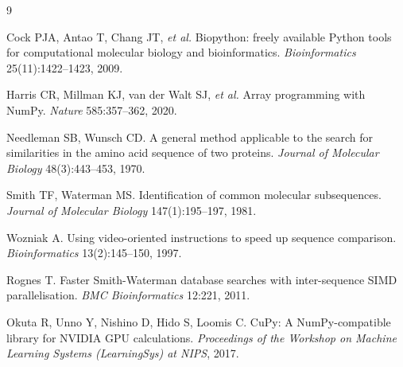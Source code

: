 \documentclass[10pt,letterpaper]{article}
\begin{document}
\begin{thebibliography}{9}
\small

Cock PJA, Antao T, Chang JT, \emph{et al.}
Biopython: freely available Python tools for computational molecular biology and
bioinformatics.
\emph{Bioinformatics} 25(11):1422--1423, 2009.

Harris CR, Millman KJ, van der Walt SJ, \emph{et al.}
Array programming with NumPy.
\emph{Nature} 585:357--362, 2020.

Needleman SB, Wunsch CD.
A general method applicable to the search for similarities in the amino acid
sequence of two proteins.
\emph{Journal of Molecular Biology} 48(3):443--453, 1970.

Smith TF, Waterman MS.
Identification of common molecular subsequences.
\emph{Journal of Molecular Biology} 147(1):195--197, 1981.

Wozniak A.
Using video-oriented instructions to speed up sequence comparison.
\emph{Bioinformatics} 13(2):145--150, 1997.

Rognes T.
Faster Smith-Waterman database searches with inter-sequence SIMD
parallelisation.
\emph{BMC Bioinformatics} 12:221, 2011.

Okuta R, Unno Y, Nishino D, Hido S, Loomis C.
CuPy: A NumPy-compatible library for NVIDIA GPU calculations.
\emph{Proceedings of the Workshop on Machine Learning Systems (LearningSys) at
NIPS}, 2017.

\end{thebibliography}
\end{document}
